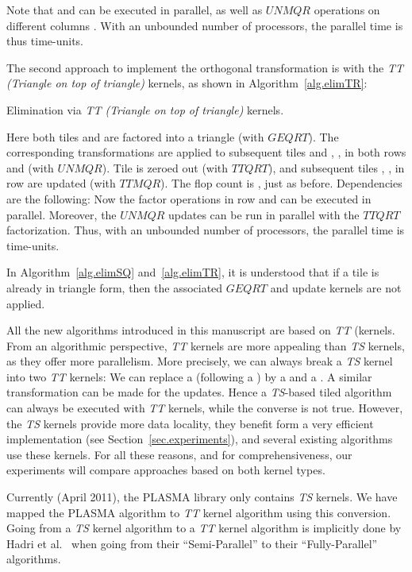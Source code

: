 \documentclass[a4paper,twopages]{article}
\newcommand{\GEQRT}{\ensuremath{\mathit{GEQRT}}\xspace}
\newcommand{\UNMQR}{\ensuremath{\mathit{UNMQR}}\xspace}
\newcommand{\TTQRT}{\ensuremath{\mathit{TTQRT}}\xspace}
\newcommand{\TTMQR}{\ensuremath{\mathit{TTMQR}}\xspace}
\begin{document}
Note that  and  can be executed in
parallel, as well as \UNMQR operations on different columns . With an
unbounded number of processors, the parallel time is thus 
time-units.

The second approach to implement the orthogonal transformation \linebreak  is with the \emph{TT (Triangle on top of triangle)} kernels, as shown in
Algorithm~\ref{alg.elimTR}:

\begin{algorithm}[htbp]
  \DontPrintSemicolon
  \;
  \;
  \;
\caption{Elimination  via \emph{TT (Triangle on top of triangle)} kernels.}
\label{alg.elimTR}
\end{algorithm}

Here both tiles  and  are factored into a triangle (with
\GEQRT). The corresponding transformations are applied to subsequent tiles
 and , , in both rows  and  (with \UNMQR).
Tile  is zeroed out (with \TTQRT), and subsequent tiles , ,
in row  are updated (with \TTMQR).  The flop count is
, just as before.  Dependencies are the
following:
Now the factor operations in row  and  can be executed in parallel.
Moreover, the \UNMQR updates can be run in parallel with the \TTQRT
factorization.  Thus, with an unbounded number of processors, the parallel time
is  time-units.

\medskip
In Algorithm~\ref{alg.elimSQ} and~\ref{alg.elimTR}, it is understood that if a
tile is already in triangle form, then the associated \GEQRT and update kernels
are not applied.

All the new algorithms
introduced in this manuscript are based on \emph{TT} (kernels.  From an algorithmic perspective, \emph{TT} kernels
are more appealing than \emph{TS} kernels, as they offer more parallelism.
More precisely, we can always break a \emph{TS} kernel into two \emph{TT} kernels: We
can replace a  (following a ) by a  and a . A similar transformation can be made for the updates. Hence a \emph{TS}-based tiled algorithm can always be executed with \emph{TT} kernels,
while the converse is not true.
However, the \emph{TS} kernels provide more data locality, they
benefit form a very efficient implementation (see Section~\ref{sec.experiments}), and several existing
algorithms use these kernels. For all these reasons, and for comprehensiveness,
our experiments will compare approaches based on both kernel types.

Currently (April 2011), the PLASMA library only contains \emph{TS} kernels. We have
mapped the PLASMA algorithm to \emph{TT} kernel algorithm using this
conversion. Going from a \emph{TS} kernel algorithm to a \emph{TT} kernel
algorithm is implicitly done by Hadri et al.~\cite{Hadri_enhancingparallelism} when going
from their ``Semi-Parallel'' to their ``Fully-Parallel'' algorithms.
\end{document}

